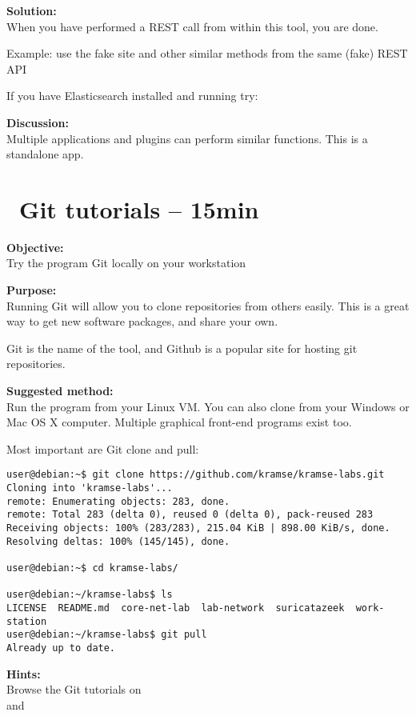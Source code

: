 \documentclass[a4paper,11pt,notitlepage]{report}
\begin{document}
{\bf Solution:}\\
When you have performed a REST call from within this tool, you are done.

Example: use the fake site  and other similar methods from the same (fake) REST API

If you have Elasticsearch installed and running try: 

{\bf Discussion:}\\
Multiple applications and plugins can perform similar functions. This is a standalone app.


\chapter{\faExclamationTriangle\ Git tutorials -- 15min}
\label{ex:git-tutorial}



{\bf Objective:}\\
Try the program Git locally on your workstation

{\bf Purpose:}\\
Running Git will allow you to clone repositories from others easily. This is a great way to get new software packages, and share your own.

Git is the name of the tool, and Github is a popular site for hosting git repositories.

{\bf Suggested method:}\\
Run the program from your Linux VM. You can also clone from your Windows or Mac OS X computer. Multiple graphical front-end programs exist too.

Most important are Git clone and pull:
\begin{verbatim}
user@debian:~$ git clone https://github.com/kramse/kramse-labs.git
Cloning into 'kramse-labs'...
remote: Enumerating objects: 283, done.
remote: Total 283 (delta 0), reused 0 (delta 0), pack-reused 283
Receiving objects: 100% (283/283), 215.04 KiB | 898.00 KiB/s, done.
Resolving deltas: 100% (145/145), done.

user@debian:~$ cd kramse-labs/

user@debian:~/kramse-labs$ ls
LICENSE  README.md  core-net-lab  lab-network  suricatazeek  work-station
user@debian:~/kramse-labs$ git pull
Already up to date.
\end{verbatim}

{\bf Hints:}\\
Browse the Git tutorials on \\
and 
\end{document}
